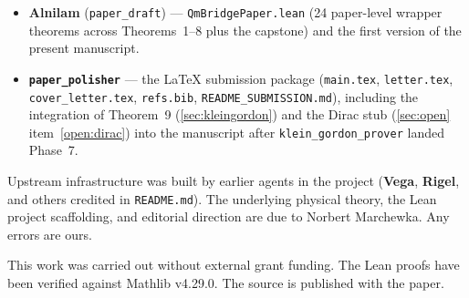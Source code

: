 \documentclass[11pt,a4paper,twoside]{article}
\theoremstyle{definition}
\newcommand{\code}[1]{\texttt{#1}}
\begin{document}
\begin{itemize}
  \code{coarseGrain\_satisfies\_kleinGordon\_static} and dynamical
  bounds, the Minkowski flat-vacuum corollaries, and the
  companion lemmas \code{kleinGordon\_mass\_shell\_consistent} and
  \code{kleinGordon\_nonRelativistic\_limit} that tie T9 to T4's
  dispersion bridge and T2's Schr\"odinger kinetic term.
  Also \code{DiracOptional.lean} including the Prop-carrying
  \code{DiracFromLatticeData} structure and the
  \code{diracFromLattice\_partial} stub recording the open
  spin-$1/2$ extension via Cartan--Sciama--Kibble torsion.
\item \textbf{Alnilam} (\code{paper\_draft}) ---
  \code{QmBridgePaper.lean} (24 paper-level wrapper theorems across
  Theorems~1--8 plus the capstone) and the first version of the
  present manuscript.
\item \textbf{\code{paper\_polisher}} --- the LaTeX submission
  package (\texttt{main.tex}, \texttt{letter.tex},
  \texttt{cover\_letter.tex}, \texttt{refs.bib},
  \texttt{README\_SUBMISSION.md}), including the integration of
  Theorem~9 (\cref{sec:kleingordon}) and the Dirac stub
  (\cref{sec:open} item~\ref{open:dirac}) into the manuscript after
  \code{klein\_gordon\_prover} landed Phase~7.
\end{itemize}

Upstream infrastructure was built by earlier agents in the project
(\textbf{Vega}, \textbf{Rigel}, and others credited in
\code{README.md}). The underlying physical theory, the Lean project
scaffolding, and editorial direction are due to Norbert Marchewka. Any
errors are ours.

This work was carried out without external grant funding. The Lean
proofs have been verified against Mathlib v4.29.0. The source is
published with the paper.



\end{document}
